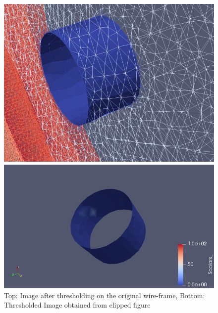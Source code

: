 \documentclass[a4paper,11pt]{article}
\theoremstyle{mytheor}
\begin{document}
\begin{figure}[!h]
    \centering
    \includegraphics[scale = 0.60]{Q3_Threshold(0-5).PNG}
    
    \vspace{1 cm}
    \includegraphics[scale = 0.60]{Q3_T(0,40).PNG}
    
    \caption{Top: Image after thresholding on the original wire-frame, Bottom: Thresholded Image obtained from clipped figure}
    \label{fig:q32}
\end{figure}
\end{document}
